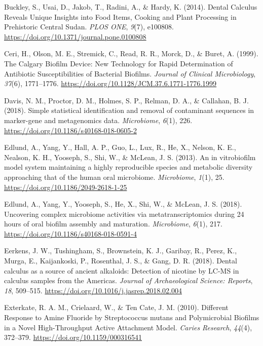 \documentclass[
]{article}
\newlength{\cslhangindent}
\newlength{\cslentryspacingunit} %
\newenvironment{CSLReferences}[2] %
 {%
  \setlength{\parindent}{0pt}
  \ifodd #1
  \let\oldpar\par
  \def\par{\hangindent=\cslhangindent\oldpar}
  \fi
  \setlength{\parskip}{#2\cslentryspacingunit}
 }%
 {}
\begin{document}
\begin{CSLReferences}{1}{0}
\leavevmode{}%
Buckley, S., Usai, D., Jakob, T., Radini, A., \& Hardy, K. (2014).
Dental {Calculus Reveals Unique Insights} into {Food Items}, {Cooking}
and {Plant Processing} in {Prehistoric Central Sudan}. \emph{PLOS ONE},
\emph{9}(7), e100808. \url{https://doi.org/10.1371/journal.pone.0100808}

\leavevmode{}%
Ceri, H., Olson, M. E., Stremick, C., Read, R. R., Morck, D., \& Buret,
A. (1999). The {Calgary Biofilm Device}: {New Technology} for {Rapid
Determination} of {Antibiotic Susceptibilities} of {Bacterial Biofilms}.
\emph{Journal of Clinical Microbiology}, \emph{37}(6), 1771--1776.
\url{https://doi.org/10.1128/JCM.37.6.1771-1776.1999}

\leavevmode{}%
Davis, N. M., Proctor, D. M., Holmes, S. P., Relman, D. A., \& Callahan,
B. J. (2018). Simple statistical identification and removal of
contaminant sequences in marker-gene and metagenomics data.
\emph{Microbiome}, \emph{6}(1), 226.
\url{https://doi.org/10.1186/s40168-018-0605-2}

\leavevmode{}%
Edlund, A., Yang, Y., Hall, A. P., Guo, L., Lux, R., He, X., Nelson, K.
E., Nealson, K. H., Yooseph, S., Shi, W., \& McLean, J. S. (2013). An in
vitrobiofilm model system maintaining a highly reproducible species and
metabolic diversity approaching that of the human oral microbiome.
\emph{Microbiome}, \emph{1}(1), 25.
\url{https://doi.org/10.1186/2049-2618-1-25}

\leavevmode{}%
Edlund, A., Yang, Y., Yooseph, S., He, X., Shi, W., \& McLean, J. S.
(2018). Uncovering complex microbiome activities via metatranscriptomics
during 24 hours of oral biofilm assembly and maturation.
\emph{Microbiome}, \emph{6}(1), 217.
\url{https://doi.org/10.1186/s40168-018-0591-4}

\leavevmode{}%
Eerkens, J. W., Tushingham, S., Brownstein, K. J., Garibay, R., Perez,
K., Murga, E., Kaijankoski, P., Rosenthal, J. S., \& Gang, D. R. (2018).
Dental calculus as a source of ancient alkaloids: {Detection} of
nicotine by {LC-MS} in calculus samples from the {Americas}.
\emph{Journal of Archaeological Science: Reports}, \emph{18}, 509--515.
\url{https://doi.org/10.1016/j.jasrep.2018.02.004}

\leavevmode{}%
Exterkate, R. A. M., Crielaard, W., \& Ten Cate, J. M. (2010). Different
{Response} to {Amine Fluoride} by {Streptococcus} mutans and
{Polymicrobial Biofilms} in a {Novel High-Throughput Active Attachment
Model}. \emph{Caries Research}, \emph{44}(4), 372--379.
\url{https://doi.org/10.1159/000316541}


\end{CSLReferences}
\end{document}
